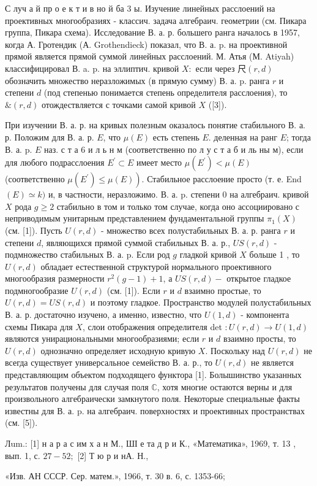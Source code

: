 \documentclass[10pt]{article}
\begin{document}
С луч а й пр о е к т и в но й ба 3 ы. Изучение линейных расслоений на проективных многообразиях - классич. задача алгебраич. геометрии (см. Пикара группа, Пикара схема). Исследование В. а. р. большего ранга началось в 1957, когда А. Гротендик (А. Grothendieck) показал, что В. а. p. на проективной прямой является прямой суммой линейных расслоений. М. Атья (М. Atiyah) классифицировал В. a. p. на эллиптич. кривой $X:$ если через $\mathscr{尺}(r, d)$ обозначить множество неразложимых (в прямую сумму) В. а. p. ранга $r$ и степени $d$ (под степенью понимается степень определителя расслоения), то $\mathscr{\&}(r, d)$ отождествляется с точками самой кривой $X$ ([3]).



При изучении В. а. р. на кривых полезным оказалось понятие стабильного В. а. р. Положим для В. а. р. $E$, что $\mu(E)$ есть степень $E$. деленная на ранг $E$; тогда В. а. p. $E$ наз. с т а 6 и л ь н м (соответственно по л у с т а б и ль ны м), если для любого подрасслоения $E^{\prime} \subset E$ имеет место $\mu\left(E^{\prime}\right)<\mu(E)$ (соответственно $\left.\mu\left(E^{\prime}\right) \leqslant \mu(E)\right)$. Стабильное расслоение просто (т. е. End $(E) \simeq k)$ и, в частности, неразложимо. В. а. p. степени 0 на алгебраич. кривой $X$ рода $g \geqslant 2$ стабильно в том и только том случае, когда оно ассоциировано с неприводимым унитарным представлением фундаментальной группы $\pi_{1}(X)$ (см. [1]). Пусть $U(r, d)$ - множество всех полустабильных В. а. р. ранга $r$ и степени $d$, являющихся прямой суммой стабильных В. а. р., $U S(r, d)$ - подмножество стабильных В. а. p. Если род $g$ гладкой кривой $X$ больше 1 , то $U(r, d)$ обладает естественной структурой нормального проективного многообразия размерности $r^{2}(g-1)+1$, а $U S(r, d)-$ открытое гладкое подмногообразие $U(r, d)$ (см. [1]). Если $r$ и $d$ взаимно простые, то $U(r, d)=U S(r, d)$ и поэтому гладкое. Пространство модулей полустабильных В. а. р. достаточно изучено, а именно, известно, что $U(1, d)$ - компонента схемы Пикара для $X$, слои отображения определителя det $: U(r, d) \rightarrow U(1, d)$ являются унирациональными многообразиями; если $r$ и $d$ взаимно просты, то $U(r, d)$ однозначно определяет исходную кривую $X$. Поскольку над $U(r, d)$ не всегда существует универсальное семейство В. а. р., то $U(r, d)$ не является представляющим объектом подходящего функтора [1]. Болышинство указанных результатов получены для случая поля $\mathbb{C}$, хотя многие остаются верны и для произвольного алгебраически замкнутого поля. Некоторые специальные факты известны для В. а. p. на алгебраич. поверхностях и проективных пространствах (см. [5]).



Лum.: [1] н а р а с им х а н М., ШІ е та д р и К., «Математика», 1969, т. 13 , вып. 1, с. $27-52 ;$ [2] Т ю р и нА. Н.,

«Изв. АН СССР. Сер. матем.», 1966, т. 30 в. 6, с. 1353-66;
\end{document}
